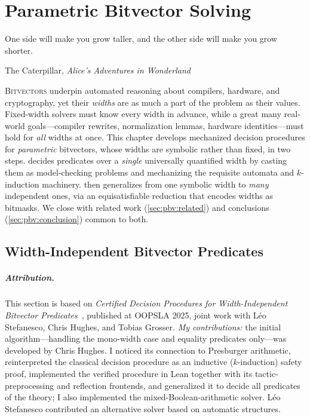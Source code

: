 \chapter{Parametric Bitvector Solving}
\label{ch:parametric-bv}
\epigraph{One side will make you grow taller, and the other side will make you
grow shorter.}{The Caterpillar, \emph{Alice's Adventures in Wonderland}}

\lettrine{B}{itvectors} underpin automated reasoning about compilers, hardware,
and cryptography, yet their \emph{widths} are as much a part of the problem as
their values. Fixed-width solvers must know every width in advance, while a
great many real-world goals---compiler rewrites, normalization lemmas, hardware
identities---must hold for \emph{all} widths at once. This chapter develops
mechanized decision procedures for \emph{parametric} bitvectors, whose widths
are symbolic rather than fixed, in two steps. 
decides predicates over a \emph{single} universally quantified width by casting
them as model-checking problems and mechanizing the requisite automata and
$k$-induction machinery.  then generalizes from one
symbolic width to \emph{many} independent ones, via an equisatisfiable
reduction that encodes widths as bitmasks. We close with related work
(\cref{sec:pbv:related}) and conclusions (\cref{sec:pbv:conclusion}) common to
both.

\section{Width-Independent Bitvector Predicates}
\label{sec:pbv:single-width}

\paragraph*{Attribution.} This section is based on \emph{Certified Decision
Procedures for Width-Independent Bitvector Predicates}~\citep{bhat2025certified},
published at OOPSLA 2025, joint work with Léo Stefanesco, Chris Hughes, and
Tobias Grosser.
\emph{My contributions:} the initial algorithm---handling the mono-width case and
equality predicates only---was developed by Chris Hughes. I noticed its
connection to Presburger arithmetic, reinterpreted the classical decision
procedure as an inductive ($k$-induction) safety proof, implemented the verified
procedure in Lean together with its tactic-preprocessing and reflection
frontends, and generalized it to decide all predicates of the theory; I also
implemented the mixed-Boolean-arithmetic solver. Léo Stefanesco contributed an
alternative solver based on automatic structures.

